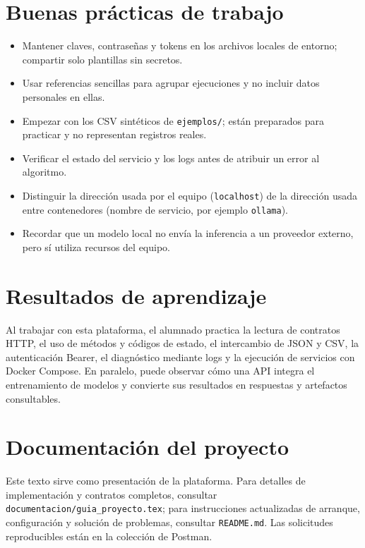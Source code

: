 \documentclass[11pt,a4paper]{article}
\begin{document}
\section{Buenas prácticas de trabajo}
\begin{itemize}
\item Mantener claves, contraseñas y tokens en los archivos locales de entorno; compartir solo plantillas sin secretos.
\item Usar referencias sencillas para agrupar ejecuciones y no incluir datos personales en ellas.
\item Empezar con los CSV sintéticos de \texttt{ejemplos/}; están preparados para practicar y no representan registros reales.
\item Verificar el estado del servicio y los logs antes de atribuir un error al algoritmo.
\item Distinguir la dirección usada por el equipo (\texttt{localhost}) de la dirección usada entre contenedores (nombre de servicio, por ejemplo \texttt{ollama}).
\item Recordar que un modelo local no envía la inferencia a un proveedor externo, pero sí utiliza recursos del equipo.
\end{itemize}

\section{Resultados de aprendizaje}
Al trabajar con esta plataforma, el alumnado practica la lectura de contratos HTTP, el uso de métodos y códigos de estado, el intercambio de JSON y CSV, la autenticación Bearer, el diagnóstico mediante logs y la ejecución de servicios con Docker Compose. En paralelo, puede observar cómo una API integra el entrenamiento de modelos y convierte sus resultados en respuestas y artefactos consultables.

\section{Documentación del proyecto}
Este texto sirve como presentación de la plataforma. Para detalles de implementación y contratos completos, consultar \texttt{documentacion/guia\_proyecto.tex}; para instrucciones actualizadas de arranque, configuración y solución de problemas, consultar \texttt{README.md}. Las solicitudes reproducibles están en la colección de Postman.
\end{document}
